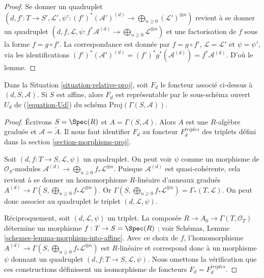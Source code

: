 \begin{proof}
Se donner un quadruplet
$(d, f' : T \to S', \mathcal{L}',
\psi' : (f')^*(\mathcal{A}')^{(d)} \to
\bigoplus_{n \geq 0} (\mathcal{L}')^{\otimes n})$
revient à se donner un quadruplet
$(d, f, \mathcal{L},
\psi : f^*\mathcal{A}^{(d)} \to
\bigoplus_{n \geq 0} \mathcal{L}^{\otimes n})$
et une factorisation de $f$ sous la forme $f = g \circ f'$. La correspondance est donnée par
$f = g \circ f'$, $\mathcal{L} = \mathcal{L}'$ et $\psi = \psi'$, via les
identifications
$(f')^*(\mathcal{A}')^{(d)} = (f')^*g^*(\mathcal{A}^{(d)}) =
f^*\mathcal{A}^{(d)}$. D'où le lemme.
\end{proof}

\begin{lemma}
\label{lemma-relative-proj-affine}
Dans la Situation \ref{situation-relative-proj}, soit $F_d$ le foncteur
associé ci-dessus à $(d, S, \mathcal{A})$.
Si $S$ est affine, alors $F_d$
est représentable par le sous-schéma ouvert $U_d$ de (\ref{equation-Ud})
du schéma $\text{Proj}(\Gamma(S, \mathcal{A}))$.
\end{lemma}

\begin{proof}
Écrivons $S = \Spec(R)$ et $A = \Gamma(S, \mathcal{A})$.
Alors $A$ est une $R$-algèbre graduée et $\mathcal{A} = \widetilde A$.
Il nous faut identifier $F_d$ au
foncteur $F_d^{triples}$ des triplets
défini dans la section \ref{section-morphisms-proj}.

\medskip\noindent
Soit $(d, f : T \to S, \mathcal{L}, \psi)$ un quadruplet. On peut voir
$\psi$ comme un morphisme de $\mathcal{O}_S$-modules
$\mathcal{A}^{(d)} \to \bigoplus_{n \geq 0} f_*\mathcal{L}^{\otimes n}$.
Puisque $\mathcal{A}^{(d)}$ est quasi-cohérente, cela revient à se donner
un homomorphisme $R$-linéaire d'anneaux gradués
$A^{(d)} \to \Gamma(S, \bigoplus_{n \geq 0} f_*\mathcal{L}^{\otimes n})$.
Or $\Gamma(S, \bigoplus_{n \geq 0} f_*\mathcal{L}^{\otimes n}) =
\Gamma_*(T, \mathcal{L})$.
On peut donc associer au quadruplet le triplet $(d, \mathcal{L}, \psi)$.

\medskip\noindent
Réciproquement, soit $(d, \mathcal{L}, \psi)$ un triplet.
La composée $R \to A_0 \to \Gamma(T, \mathcal{O}_T)$ détermine un morphisme
$f : T \to S = \Spec(R)$ ; voir Schémas,
Lemme \ref{schemes-lemma-morphism-into-affine}. Avec ce choix de $f$,
l'homomorphisme
$A^{(d)} \to \Gamma(S, \bigoplus_{n \geq 0} f_*\mathcal{L}^{\otimes n})$
est $R$-linéaire et correspond donc à un morphisme $\psi$ donnant un
quadruplet $(d, f : T \to S, \mathcal{L}, \psi)$.
Nous omettons la vérification que ces constructions définissent un
isomorphisme de foncteurs $F_d = F_d^{triples}$.
\end{proof}

